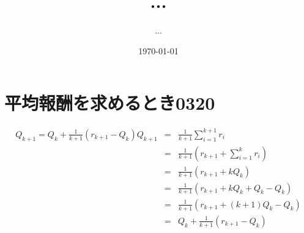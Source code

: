 \documentclass[11pt,a4paper]{jsarticle}
\title{...}
\author{...}
\date{\today}
\begin{document}
\maketitle
%
%
\section{平均報酬を求めるとき0320}
\begin{eqnarray}
    Q_{k+1} =  Q_k + \frac{1}{k+1}(r_{k+1}-Q_k) 
    Q_{k+1} &=& \frac{1}{k+1}\sum_{i=1}^{k+1}r_i \\
            &=&  \frac{1}{k+1}(r_{k+1}+\sum_{i=1}^{k}r_i) \\
            &=&  \frac{1}{k+1}(r_{k+1}+kQ_k) \\
            &=&  \frac{1}{k+1}(r_{k+1}+kQ_k+Q_k - Q_k) \\
            &=&  \frac{1}{k+1}(r_{k+1}+(k+1)Q_k-Q_k) \\
            &=&  Q_k + \frac{1}{k+1}(r_{k+1}-Q_k) 
\end{eqnarray}

%
%
\end{document}
